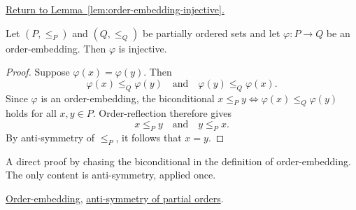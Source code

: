 
\newpage
{}
\label{prf:order-embedding-injective}

\begin{remark*}[Return]
\hyperref[lem:order-embedding-injective]{Return to Lemma~\ref*{lem:order-embedding-injective}.}
\end{remark*}

\begin{theorem*}
Let $(P, \leq_P)$ and $(Q, \leq_Q)$ be partially ordered sets and let
$\varphi : P \to Q$ be an order-embedding.  Then $\varphi$ is injective.
\end{theorem*}

\begin{proof}[Proof]
Suppose $\varphi(x) = \varphi(y)$.  Then
\[
\varphi(x) \leq_Q \varphi(y) \quad\text{and}\quad \varphi(y) \leq_Q \varphi(x).
\]
Since $\varphi$ is an order-embedding, the biconditional
$x \leq_P y \Longleftrightarrow \varphi(x) \leq_Q \varphi(y)$ holds for
all $x, y \in P$.  Order-reflection therefore gives
\[
x \leq_P y \quad\text{and}\quad y \leq_P x.
\]
By anti-symmetry of $\leq_P$, it follows that $x = y$.
\end{proof}

\begin{remark*}
A direct proof by chasing the biconditional in the definition of
order-embedding.  The only content is anti-symmetry, applied once.
\end{remark*}

\begin{remark*}[Dependencies]
\hyperref[def:order-embedding]{Order-embedding},
\hyperref[def:lattice-order-partial-order]{anti-symmetry of partial orders}.
\end{remark*}
